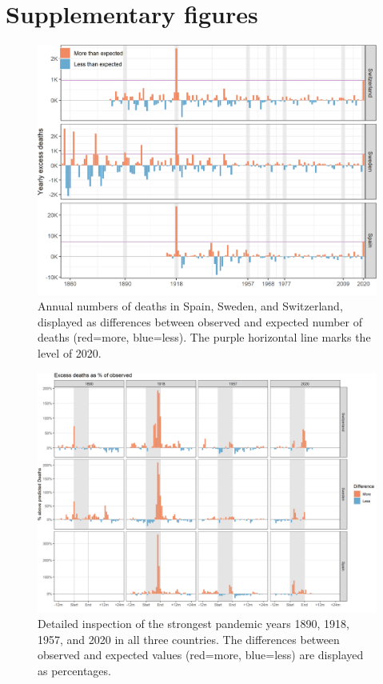 \documentclass{article}
\begin{document}
	\section{Supplementary figures}
	
	\begin{figure}[H]
		\centering	
		\includegraphics[width=\linewidth]{../Figure_S1.png}
		\caption{Annual numbers of deaths in Spain, Sweden, and Switzerland, displayed as differences between observed and expected number of deaths (red=more, blue=less). The purple horizontal line marks the level of 2020.}
	\end{figure}

	
	\begin{figure}[H]
		\centering	
		\includegraphics[width=\linewidth]{../Figure_S2.png}
		\caption{Detailed inspection of the strongest pandemic years 1890, 1918, 1957, and 2020 in all three countries. The differences between observed and expected values (red=more, blue=less) are displayed as percentages.}
	\end{figure}
\end{document}
